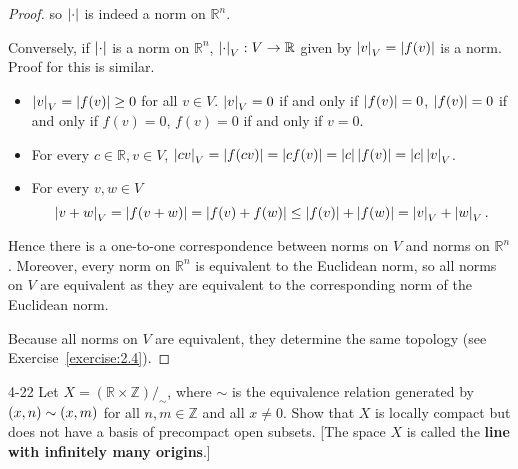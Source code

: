 \begin{proof}
	so $\left\vert{\cdot}\right\vert$ is indeed a norm on $\mathbb{R}^{n}$.

	Conversely, if $\left\vert{\cdot}\right\vert$ is a norm on $\mathbb{R}^{n}$, $\left\vert{\cdot}\right\vert_{V}: V\to \mathbb{R}$ given by $\left\vert{v}\right\vert_{V} = \left\vert{f(v)}\right\vert$ is a norm. Proof for this is similar.
	\begin{itemize}
		\item $\left\vert{v}\right\vert_{V} = \left\vert{f(v)}\right\vert \geq 0$ for all $v\in V$. $\left\vert{v}\right\vert_{V} = 0$ if and only if $\left\vert{f(v)}\right\vert = 0$, $\left\vert{f(v)}\right\vert = 0$ if and only if $f(v) = 0$, $f(v) = 0$ if and only if $v = 0$.
		\item For every $c\in \mathbb{R}, v\in V$, $\left\vert{cv}\right\vert_{V} = \left\vert{f(cv)}\right\vert = \left\vert{cf(v)}\right\vert = \left\vert{c}\right\vert\left\vert{f(v)}\right\vert = \left\vert{c}\right\vert\left\vert{v}\right\vert_{V}$.
		\item For every $v, w\in V$
		      \begin{equation*}
			      \left\vert{v + w}\right\vert_{V} = \left\vert{f(v + w)}\right\vert = \left\vert{f(v) + f(w)}\right\vert \leq \left\vert{f(v)}\right\vert + \left\vert{f(w)}\right\vert = \left\vert{v}\right\vert_{V} + \left\vert{w}\right\vert_{V}.
		      \end{equation*}
	\end{itemize}

	Hence there is a one-to-one correspondence between norms on $V$ and norms on $\mathbb{R}^{n}$. Moreover, every norm on $\mathbb{R}^{n}$ is equivalent to the Euclidean norm, so all norms on $V$ are equivalent as they are equivalent to the corresponding norm of the Euclidean norm.

	Because all norms on $V$ are equivalent, they determine the same topology (see Exercise~\ref{exercise:2.4}).
\end{proof}

\begin{problem}{4-22}
Let $X = (\mathbb{R} \times \mathbb{Z})/_{\sim}$, where $\sim$ is the equivalence relation generated by $\left({x, n}\right) \sim \left({x, m}\right)$ for all $n, m \in \mathbb{Z}$ and all $x \ne 0$. Show that $X$ is locally compact but does not have a basis of precompact open subsets. [The space $X$ is called the \textbf{line with infinitely many origins}.]
\end{problem}

